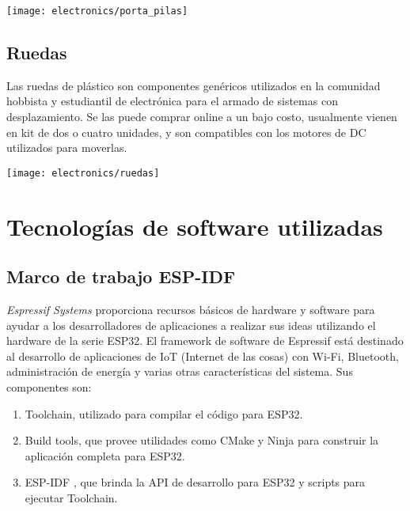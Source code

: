 \begin{center}
  \centering
  \texttt{[image: electronics/porta\_pilas]}
  \label{fig:porta_pilas}
\end{center}

\subsection{Ruedas}

Las ruedas de plástico son componentes genéricos utilizados en la comunidad hobbista y estudiantil de electrónica para el armado de sistemas con desplazamiento. Se las puede comprar online a un bajo costo, usualmente vienen en kit de dos o cuatro unidades, y son compatibles con los motores de DC utilizados para moverlas.

\begin{center}
  \centering
  \texttt{[image: electronics/ruedas]}
  \label{fig:ruedas}
\end{center}

\section{Tecnologías de software utilizadas}

\subsection{Marco de trabajo ESP-IDF}

\textit{Espressif Systems} proporciona recursos básicos de hardware y software para ayudar a los desarrolladores de aplicaciones a realizar sus ideas utilizando el hardware de la serie ESP32. El framework de software de Espressif está destinado al desarrollo de aplicaciones de IoT (Internet de las cosas) con Wi-Fi, Bluetooth, administración de energía y varias otras características del sistema.
Sus componentes son:
\begin{enumerate}
	\item Toolchain, utilizado para compilar el código para ESP32.
	\item Build tools, que provee utilidades como CMake \cite{cmake_website} y Ninja \cite{ninja_website} para construir la aplicación completa para ESP32.
	\item ESP-IDF \cite{ESPIDF_home}, que brinda la API de desarrollo para ESP32 y scripts para ejecutar Toolchain.
	
\end{enumerate}

